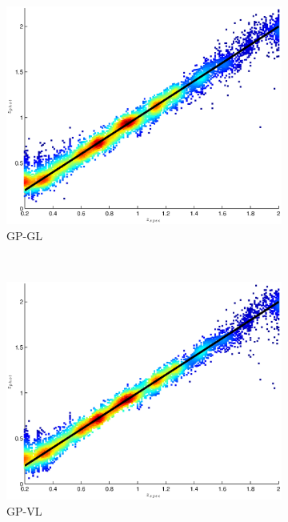 \documentclass[useAMS,usenatbib,fleqn]{mn2e}
\begin{document}
\begin{figure}
\begin{subfigure}[b]{0.175\textwidth}
                \includegraphics[width=\textwidth]{figures/GPGL.eps}
                \caption{GP-GL}
        \end{subfigure}
        ~
        \begin{subfigure}[b]{0.175\textwidth}
               \includegraphics[width=\textwidth]{figures/GPVL.eps}
                \caption{GP-VL}
        \end{subfigure}
        ~
        \begin{subfigure}[b]{0.175\textwidth}

\end{subfigure}
\end{figure}
\end{document}
